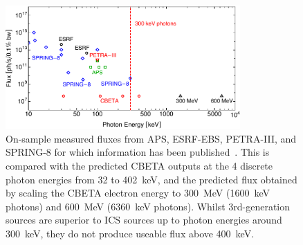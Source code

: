 \documentclass[../main.tex]{subfiles}
\begin{document}
\begin{figure}[!htb]
\centering
\includegraphics[width=0.8\textwidth]{Figures/CBETA_Inverse_Compton_Source_Design/sourcefluxcomparison.pdf}
\caption{On-sample measured fluxes from APS, ESRF-EBS, PETRA-III, and SPRING-8 for which information has been published~\cite{apsbeamlines,esrfbeamlines,petraiiibeamlines,spring8beamlines}. This is compared with the predicted CBETA outputs at the 4 discrete photon energies from 32 to 402~keV, and the predicted flux obtained by scaling the CBETA electron energy to 300~MeV (1600~keV photons) and 600~MeV (6360~keV photons). Whilst 3rd-generation sources are superior to ICS sources up to photon energies around 300~keV, they do not produce useable flux above 400~keV.}
\label{fig:ICS_Undulator_Comparison}
\end{figure}
\end{document}
